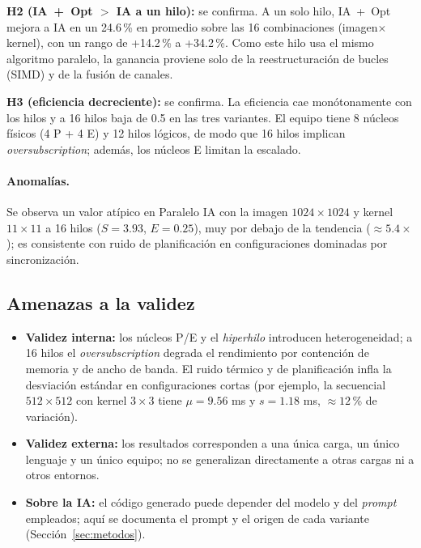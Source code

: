 \documentclass[12pt]{article}
\begin{document}
\textbf{H2 (IA~+~Opt $>$ IA a un hilo):} se confirma. A un solo hilo, IA~+~Opt
mejora a IA en un 24.6\,\% en promedio sobre las 16 combinaciones
(imagen$\times$kernel), con un rango de +14.2\,\% a +34.2\,\%. Como este hilo usa el
mismo algoritmo paralelo, la ganancia proviene solo de la reestructuración de
bucles (SIMD) y de la fusión de canales.

\textbf{H3 (eficiencia decreciente):} se confirma. La eficiencia cae
monótonamente con los hilos y a 16 hilos baja de 0.5 en las tres variantes. El
equipo tiene 8 núcleos físicos (4 P + 4 E) y 12 hilos lógicos, de modo que 16
hilos implican \emph{oversubscription}; además, los núcleos E limitan la escalado.

\paragraph{Anomalías.} Se observa un valor atípico en Paralelo IA con la imagen
$1024\times1024$ y kernel $11\times11$ a 16 hilos ($S=3.93$, $E=0.25$), muy por
debajo de la tendencia ($\approx5.4\times$); es consistente con ruido de
planificación en configuraciones dominadas por sincronización.

\subsection{Amenazas a la validez}
\begin{itemize}[leftmargin=1.4em,itemsep=1pt]
  \item \textbf{Validez interna:} los núcleos P/E y el \emph{hiperhilo} introducen
  heterogeneidad; a 16 hilos el \emph{oversubscription} degrada el rendimiento por
  contención de memoria y de ancho de banda. El ruido térmico y de planificación
  infla la desviación estándar en configuraciones cortas (por ejemplo, la
  secuencial $512\times512$ con kernel $3\times3$ tiene $\mu=9.56$ ms y $s=1.18$ ms,
  $\approx12$\,\% de variación).
  \item \textbf{Validez externa:} los resultados corresponden a una única carga,
  un único lenguaje y un único equipo; no se generalizan directamente a otras
  cargas ni a otros entornos.
  \item \textbf{Sobre la IA:} el código generado puede depender del modelo y del
  \emph{prompt} empleados; aquí se documenta el prompt y el origen de cada variante
  (Sección~\ref{sec:metodos}).
\end{itemize}

\end{document}
